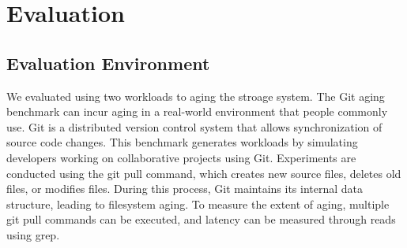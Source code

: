 \section{Evaluation}\label{s:eval}

\subsection{Evaluation Environment}

We evaluated using two workloads to aging the stroage system.
The Git aging benchmark\cite{conway:login17,senescence:fast17} can incur aging in a real-world environment that people commonly use.
Git is a distributed version control system that allows synchronization of source code changes.
This benchmark generates workloads by simulating developers working on collaborative projects using Git.
Experiments are conducted using the git pull command, which creates new source files, deletes old files, or modifies files. During this process, Git maintains its internal data structure, leading to filesystem aging.
To measure the extent of aging, multiple git pull commands can be executed, and latency can be measured through reads using grep.

